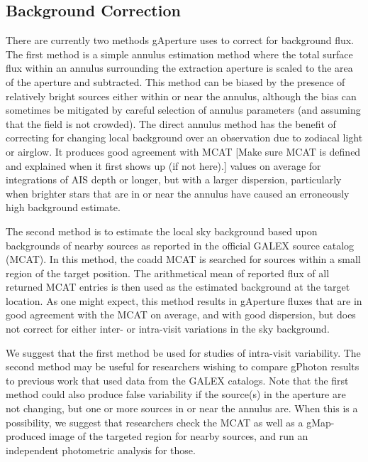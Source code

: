 \documentclass[5p]{elsarticle}
\begin{document}
\subsection{Background Correction}
There are currently two methods gAperture uses to correct for background flux.  The first method is a simple annulus estimation method where the total surface flux within an annulus surrounding the extraction aperture is scaled to the area of the aperture and subtracted. This method can be biased by the presence of relatively bright sources either within or near the annulus, although the bias can sometimes be mitigated by careful selection of annulus parameters (and assuming that the field is not crowded). The direct annulus method has the benefit of correcting for changing local background over an observation due to zodiacal light or airglow. It produces good agreement with MCAT {\color{red}[Make sure MCAT is defined and explained when it first shows up (if not here).]} values on average for integrations of AIS depth or longer, but with a larger dispersion, particularly when brighter stars that are in or near the annulus have caused an erroneously high background estimate.

The second method is to estimate the local sky background based upon backgrounds of nearby sources as reported in the official GALEX source catalog (MCAT). In this method, the coadd MCAT is searched for sources within a small region of the target position. The arithmetical mean of reported flux of all returned MCAT entries is then used as the estimated background at the target location. As one might expect, this method results in gAperture fluxes that are in good agreement with the MCAT on average, and with good dispersion, but does not correct for either inter- or intra-visit variations in the sky background.

We suggest that the first method be used for studies of intra-visit variability. The second method may be useful for researchers wishing to compare gPhoton results to previous work that used data from the GALEX catalogs. Note that the first method could also produce false variability if the source(s) in the aperture are not changing, but one or more sources in or near the annulus are.  When this is a possibility, we suggest that researchers check the MCAT as well as a gMap-produced image of the targeted region for nearby sources, and run an independent photometric analysis for those.
\end{document}
